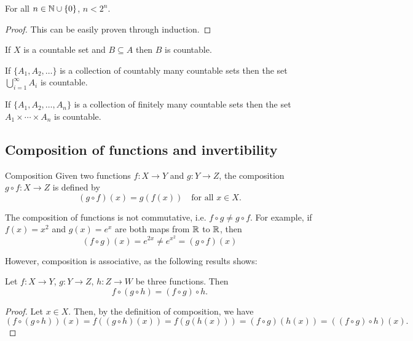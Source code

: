 \begin{corollary}
For all $n \in \mathbb N \cup \{0\}$, $n<2^n$.
\end{corollary}
\begin{proof}
This can be easily proven through induction.
\end{proof}

\begin{lemma}
If $X$ is a countable set and $B \subseteq A$ then $B$ is countable.
\end{lemma}

\begin{lemma}
If $\{A_1,A_2,\dots\}$ is a collection of countably many countable sets then the set $\bigcup_{i=1}^\infty A_i$ is countable.
\end{lemma}

\begin{lemma}
If $\{A_1,A_2,\dots,A_n\}$ is a collection of finitely many countable sets then the set $A_1\times\cdots\times A_n$ is countable.
\end{lemma}
\pagebreak

\subsection{Composition of functions and invertibility}
\begin{defn}{Composition}{}
Given two functions $f:X\to Y$ and $g:Y\to Z$, the composition $g\circ f:X\to Z$ is defined by
\[ (g \circ f)(x) = g(f(x)) \quad \text{for all }x \in X. \]
\end{defn}

The composition of functions is not commutative, i.e. $f \circ g \neq g \circ f$. For example, if $f(x) = x^2$ and $g(x) = e^x$ are both maps from $\mathbb R$ to $\mathbb R$, then
\[ (f \circ g)(x) = e^{2x} \neq e^{x^2}= (g \circ f)(x) \]

However, composition is associative, as the following results shows:
\begin{proposition}[Associativity]
Let $f:X\to Y$, $g:Y\to Z$, $h:Z\to W$ be three functions. Then
\[ f \circ (g \circ h) = (f \circ g) \circ h. \]
\end{proposition}
\begin{proof}
Let $x \in X$. Then, by the definition of composition, we have
\[ (f \circ (g \circ h))(x) = f((g \circ h)(x)) = f(g(h(x))) = (f \circ g)(h(x)) = ((f \circ g) \circ h)(x). \]
\end{proof}

